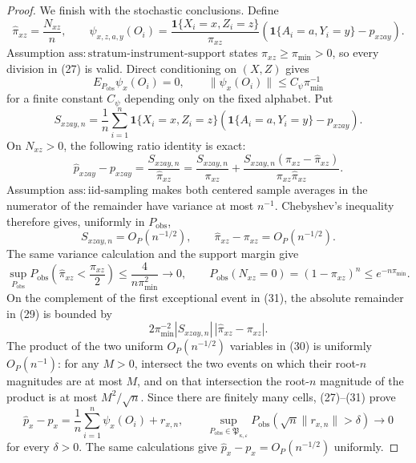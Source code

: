\documentclass{article}
\begin{document}
\begin{proof}
We finish with the stochastic conclusions.  Define
\[
 \widehat\pi_{xz}=\frac{N_{xz}}n,
 \qquad
 \psi_{x,z,a,y}(O_i)
 =\frac{\mathbf 1\{X_i=x,Z_i=z\}}{\pi_{xz}}
  \left(\mathbf 1\{A_i=a,Y_i=y\}-p_{xzay}\right).
 \tag{27}
\]
Assumption \(\mathrm{ass{:}stratum\mbox{-}instrument\mbox{-}support}\) states \(\pi_{xz}\geq\pi_{\min}>0\), so every division in (27) is valid.  Direct conditioning on \((X,Z)\) gives
\[
 E_{P_{\mathrm{obs}}}\psi_x(O_i)=0,
 \qquad
 \|\psi_x(O_i)\|\leq C_\psi\pi_{\min}^{-1}
 \tag{28}
\]
for a finite constant \(C_\psi\) depending only on the fixed alphabet.  Put
\[
 S_{xzay,n}=\frac1n\sum_{i=1}^n
 \mathbf 1\{X_i=x,Z_i=z\}
 \left(\mathbf 1\{A_i=a,Y_i=y\}-p_{xzay}\right).
\]
On \(N_{xz}>0\), the following ratio identity is exact:
\[
 \widehat p_{xzay}-p_{xzay}
 =\frac{S_{xzay,n}}{\widehat\pi_{xz}}
 =\frac{S_{xzay,n}}{\pi_{xz}}
  +\frac{S_{xzay,n}(\pi_{xz}-\widehat\pi_{xz})}
         {\pi_{xz}\widehat\pi_{xz}}.
 \tag{29}
\]
Assumption \(\mathrm{ass{:}iid\mbox{-}sampling}\) makes both centered sample averages in the numerator of the remainder have variance at most \(n^{-1}\).  Chebyshev's inequality therefore gives, uniformly in \(P_{\mathrm{obs}}\),
\[
 S_{xzay,n}=O_P(n^{-1/2}),\qquad
 \widehat\pi_{xz}-\pi_{xz}=O_P(n^{-1/2}).
 \tag{30}
\]
The same variance calculation and the support margin give
\[
 \sup_{P_{\mathrm{obs}}}
 P_{\mathrm{obs}}\!\left(\widehat\pi_{xz}<\frac{\pi_{xz}}2\right)
 \leq\frac{4}{n\pi_{\min}^2}\longrightarrow0,
 \qquad
 P_{\mathrm{obs}}(N_{xz}=0)
 =(1-\pi_{xz})^n\leq e^{-n\pi_{\min}}.
 \tag{31}
\]
On the complement of the first exceptional event in (31), the absolute remainder in (29) is bounded by
\[
 2\pi_{\min}^{-2}|S_{xzay,n}|\,
       |\widehat\pi_{xz}-\pi_{xz}|.
\]
The product of the two uniform \(O_P(n^{-1/2})\) variables in (30) is uniformly \(O_P(n^{-1})\): for any \(M>0\), intersect the two events on which their root-\(n\) magnitudes are at most \(M\), and on that intersection the root-\(n\) magnitude of the product is at most \(M^2/\sqrt n\).  Since there are finitely many cells, (27)--(31) prove
\[
 \widehat p_x-p_x
 =\frac1n\sum_{i=1}^n\psi_x(O_i)+r_{x,n},
 \qquad
 \sup_{P_{\mathrm{obs}}\in\mathfrak P_{\kappa,\varepsilon}}
 P_{\mathrm{obs}}\!\left(\sqrt n\|r_{x,n}\|>\delta\right)
 \longrightarrow0
 \tag{32}
\]
for every \(\delta>0\).  The same calculations give \(\widehat p_x-p_x=O_P(n^{-1/2})\) uniformly.


\end{proof}
\end{document}
